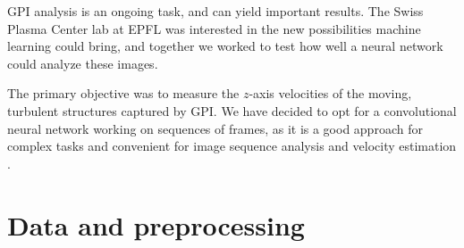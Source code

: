 \documentclass[10pt,conference]{IEEEtran}
\begin{document}
GPI analysis is an ongoing task, and can yield important results. The Swiss Plasma Center lab at EPFL was interested in the new possibilities machine learning could bring, and together we worked to test how well a neural network could analyze these images.\par
 

 
The primary objective was to measure the $z$-axis velocities of the moving, turbulent structures captured by GPI. We have decided to opt for a convolutional neural network working on sequences of frames, as it is a good approach for complex tasks and convenient for image sequence analysis and velocity estimation \cite{velocitycnn}.



\section{Data and preprocessing}
\end{document}
